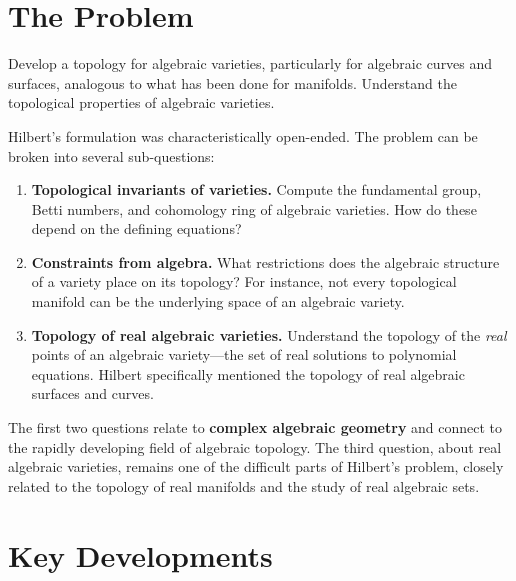 \section{The Problem}

\begin{problem_statement}
Develop a topology for algebraic varieties, particularly for algebraic curves and surfaces, analogous to what has been done for manifolds. Understand the topological properties of algebraic varieties.
\end{problem_statement}

Hilbert's formulation was characteristically open-ended. The problem can be broken into several sub-questions:

\begin{enumerate}
    \item \textbf{Topological invariants of varieties.} Compute the fundamental group, Betti numbers, and cohomology ring of algebraic varieties. How do these depend on the defining equations?

    \item \textbf{Constraints from algebra.} What restrictions does the algebraic structure of a variety place on its topology? For instance, not every topological manifold can be the underlying space of an algebraic variety.

    \item \textbf{Topology of real algebraic varieties.} Understand the topology of the \emph{real} points of an algebraic variety---the set of real solutions to polynomial equations. Hilbert specifically mentioned the topology of real algebraic surfaces and curves.
\end{enumerate}

The first two questions relate to \textbf{complex algebraic geometry} and connect to the rapidly developing field of algebraic topology. The third question, about real algebraic varieties, remains one of the difficult parts of Hilbert's problem, closely related to the topology of real manifolds and the study of real algebraic sets.

\section{Key Developments}

